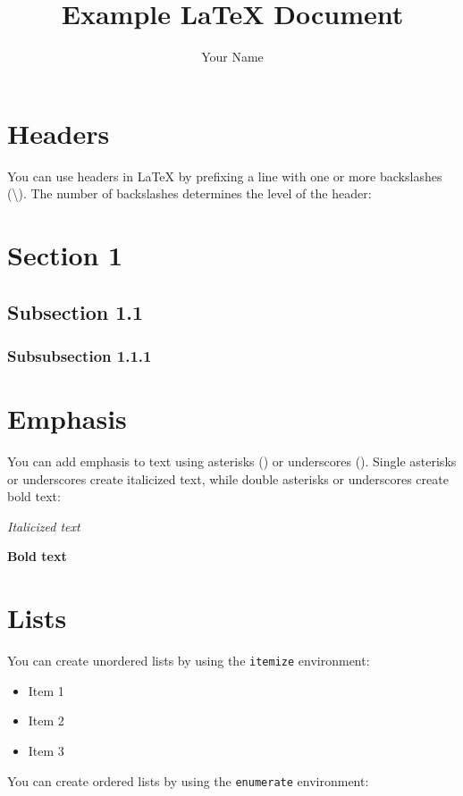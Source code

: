 \documentclass{article}
\title{Example LaTeX Document}
\author{Your Name}
\begin{document}
\maketitle

\section{Headers}

You can use headers in LaTeX by prefixing a line with one or more backslashes (\textbackslash{}). The number of backslashes determines the level of the header:

\section{Section 1}
\subsection{Subsection 1.1}
\subsubsection{Subsubsection 1.1.1}

\section{Emphasis}

You can add emphasis to text using asterisks (\textasteriskcentered{}) or underscores (\textunderscore{}). Single asterisks or underscores create italicized text, while double asterisks or underscores create bold text:

\emph{Italicized text}

\textbf{Bold text}

\section{Lists}

You can create unordered lists by using the \texttt{itemize} environment:

\begin{itemize}
  \item Item 1
  \item Item 2
  \item Item 3
\end{itemize}

You can create ordered lists by using the \texttt{enumerate} environment:
\end{document}
